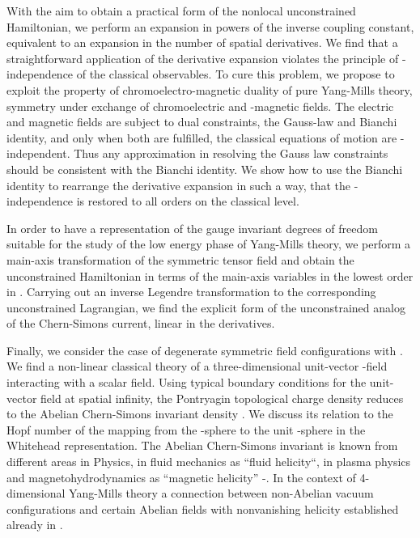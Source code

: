 \documentclass[a4paper,12pt]{article}
\begin{document}
With the aim to obtain a practical form of the nonlocal unconstrained
Hamiltonian, we perform an expansion in powers of the inverse coupling constant,
equivalent to an expansion in the number of spatial derivatives.
We find that a straightforward application of the
derivative expansion violates the principle of \myHighlight{$\theta$}\coordHE{}-independence of the
classical observables. To cure this problem,
we propose to exploit the property of chromoelectro-magnetic duality of
pure Yang-Mills theory,
symmetry under exchange of chromoelectric and -magnetic fields.
The electric and magnetic fields are subject to
dual constraints, the Gauss-law and Bianchi identity, and
only when both are fulfilled, the
classical equations of motion are \myHighlight{$\theta$}\coordHE{}-independent.
Thus any approximation in resolving the Gauss law constraints
should be consistent with the Bianchi identity.
We show how to use the Bianchi identity to
rearrange the derivative expansion in such a way,
that the \myHighlight{$\theta$}\coordHE{}-independence is restored to all orders on the classical level.

In order to have a representation of the gauge invariant degrees of freedom
suitable for the study of the low energy phase of Yang-Mills theory,
we perform a main-axis transformation of the symmetric tensor field
and obtain the unconstrained Hamiltonian
in terms of the main-axis variables in the lowest order in \coordHE{}.
Carrying out an inverse Legendre transformation
to the corresponding unconstrained Lagrangian,
we find the explicit form of the unconstrained analog of the Chern-Simons
current, linear in the derivatives.

Finally, we consider the case of degenerate symmetric field
configurations \coordHE{} with \coordHE{}.
We find a non-linear classical theory of a three-dimensional unit-vector
\coordHE{}-field interacting with a scalar field.
Using typical boundary conditions for the unit-vector field
at spatial infinity, the Pontryagin topological charge density
reduces to the Abelian Chern-Simons invariant density \cite{Jackiw}.
We discuss its relation to the Hopf number of the
mapping from the \coordHE{}-sphere \coordHE{} to the unit \coordHE{}-sphere \coordHE{}
in the Whitehead representation\cite{Whitehead}.
The Abelian Chern-Simons invariant is known from different areas in
Physics, in fluid mechanics as ``fluid helicity``,
in plasma physics and magnetohydrodynamics  as ``magnetic helicity''
\cite{Woltier}-\cite{Saffman}.
In the context of 4-dimensional Yang-Mills theory a connection between
non-Abelian vacuum configurations and certain Abelian fields with nonvanishing
helicity established already in \cite{JackiwPi,NairJackiw}.
\end{document}
